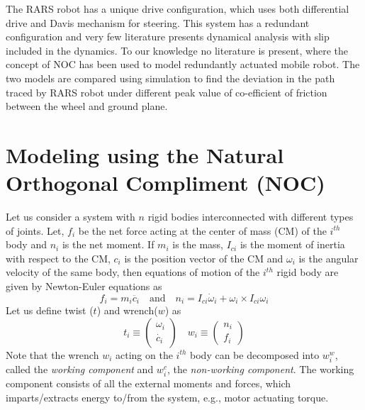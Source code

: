  The RARS robot has a unique  drive configuration, which uses both differential drive and Davis mechanism for steering. 
 This system has a redundant configuration and very few literature presents dynamical analysis with slip included in the dynamics. To our knowledge no literature is present, where the concept of  NOC  has been used to model redundantly actuated mobile robot. The two models are compared using simulation to find the deviation in the path traced by RARS robot under different peak value of co-efficient of friction between the wheel and ground plane.
   


   
 
 

  
  
  
  
  
\section{Modeling using the Natural Orthogonal Compliment (NOC)}
Let us consider a system with $n$ rigid bodies interconnected with different types of joints. 
Let, $f_i$ be the net force acting at the center of mass (CM) of the $i^{th}$  body and $n_i$ is the net moment.
 If $m_i$ is the mass, $I_{ci}$ is the  moment of inertia with respect to the CM, $c_i$ is the position vector of the CM and $\omega_i$ is the angular velocity of the same body, then equations of motion of the $i^{th}$ rigid body are given by Newton-Euler equations as 
\begin{equation}
\label{NE}
f_i=m_i\ddot{c_i} \quad \text{and} \quad n_i=I_{ci} \dot \omega_i+\omega_i \times I_{ci} \omega_i
\end{equation}
Let us  define twist ($t$) and wrench($w$) as 
\begin{equation*}
t_i \equiv \begin{pmatrix}
\omega_i\\ \dot{c_i}
\end{pmatrix} \quad
w_i \equiv \begin{pmatrix}
n_i\\f_i
\end{pmatrix}
\end{equation*}
Note that the wrench $w_i$ acting on the $i^{th}$ body can be decomposed into $w^w_i$, called the \textit{working component} and  $w^c_i$, the \textit{non-working component}.
 The working component consists of all the external  moments and forces, which imparts/extracts energy to/from the system, e.g., motor actuating torque.
